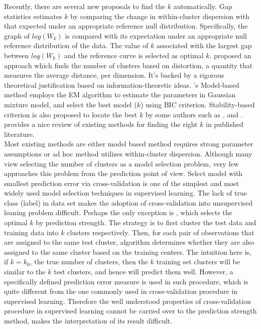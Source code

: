 \documentclass[11pt]{article}
\begin{document}
Recently, there are several new proposals to find the $k$ automatically. Gap statistics \citep{tibshirani2001estimating} estimates $k$ by comparing the change in within-cluster dispersion with that expected under an appropriate reference null distribution. Specifically, the graph of $log(W_k)$ is compared with its expectation under an appropriate null reference distribution of the data. The value of $k$ associated with the largest gap between $log(W_k)$ and the reference curve is selected as optimal $k$. \cite{sugar2003finding} proposed an approach which finds the number of clusters based on distortion, a quantity that measures the average distance, per dimension. It's backed by a rigorous theoretical justification based on information-theoretic ideas.   \cite{fraley2002model}'s Model-based method employs the EM algorithm to estimate the parameters in Gaussian mixture model, and select the best model ($k$) using BIC criterion. Stability-based criterion is also proposed to locate the best $k$ by some authors such as \cite{ben2001stability}, \cite{wang2010consistent} and \cite{fang2012selection}. \cite{chiang2010intelligent} provides a nice review of existing methods for finding the right $k$ in published literature. \\

Most existing methods are either model based method requires strong parameter assumptions or ad hoc method utilizes within-cluster dispersion. Although many view selecting the number of clusters as a model selection problem, very few approaches this problem from the prediction point of view. Select model with smallest prediction error via cross-validation is one of the simplest and most widely used model selection techniques in supervised learning. The lack of true class (label) in data set makes the adoption of cross-validation into unsupervised leaning problem difficult. Perhaps the only exception is \cite{tibshirani2005cluster}, which selects the optimal $k$ by prediction strength. The strategy is to first cluster the test data and training data into $k$ clusters respectively. Then, for each pair of observations that are assigned to the same test cluster, algorithm determines whether they are also assigned to the same cluster based on the training centers. The intuition here is, if $k=k_0$, the true number of clusters, then the $k$ training set clusters will be similar to the $k$ test clusters, and hence will predict them well. However, a specifically defined prediction error measure is used in such procedure, which is quite different from the one commonly used in cross-validation procedure in supervised learning. Therefore the well understood properties of cross-validation procedure in supervised learning cannot be carried over to the prediction strength method, makes the interpretation of its result difficult. \\
\end{document}
